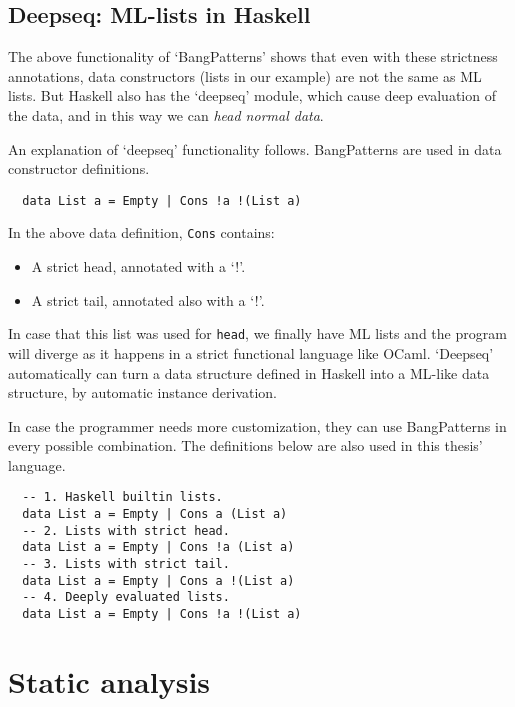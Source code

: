\documentclass[diploma]{softlab-thesis}
\begin{document}
\subsection{Deepseq: ML-lists in Haskell}
\label{sec:deepseq}

The above functionality of `BangPatterns' shows that even with these strictness annotations, data constructors (lists in our
example) are not the same as ML lists. But Haskell also has the `deepseq' module, which cause deep evaluation of the data, 
and in this way we can \textit{head normal data}. 

An explanation of `deepseq' functionality follows. BangPatterns are used in data constructor definitions.

\begin{verbatim}
  data List a = Empty | Cons !a !(List a)
\end{verbatim}

\noindent In the above data definition, \texttt{Cons} contains:
\begin{itemize}
  \item A strict head, annotated with a `!'.
  \item A strict tail, annotated also with a `!'.
\end{itemize}

In case that this list was used for \texttt{head}, we finally have ML lists and the program 
will diverge as it happens in a strict functional language like OCaml. `Deepseq' automatically can turn a data structure
defined in Haskell into a ML-like data structure, by automatic instance derivation.

In case the programmer needs more customization, they can use BangPatterns in every possible combination. 
The definitions below are also used in this thesis' language.
\begin{verbatim}
  -- 1. Haskell builtin lists.
  data List a = Empty | Cons a (List a) 
  -- 2. Lists with strict head.
  data List a = Empty | Cons !a (List a)
  -- 3. Lists with strict tail.
  data List a = Empty | Cons a !(List a)
  -- 4. Deeply evaluated lists. 
  data List a = Empty | Cons !a !(List a)
\end{verbatim}

\section {Static analysis}
\label{sec:static-analysis}

\end{document}
